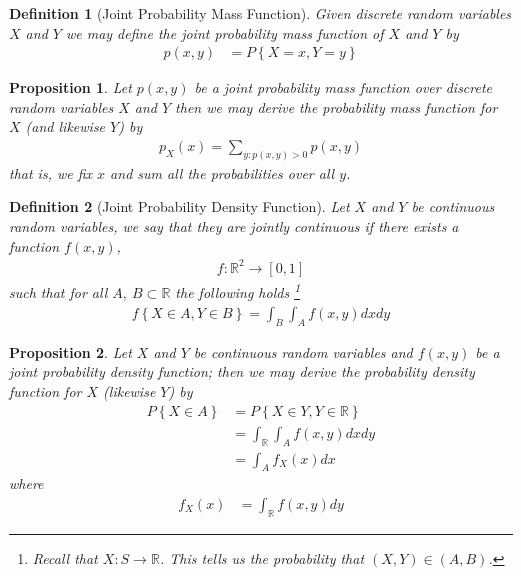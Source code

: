 \documentclass[11pt, oneside]{book}   	%
\newtheorem{definition}{Definition}[chapter]
\newtheorem{proposition}{Proposition}[chapter]
\newcommand{\set}[1]{\left\{#1\right\}}
\begin{document}
\begin{spacing}{1.618}
\begin{definition}[Joint Probability Mass Function]
	Given discrete random variables $X$ and $Y$ we may define the \emph{joint probability mass function} of $X$ and $Y$ by 
	\begin{alignat}{4}
		p(x, y)&=P\set{X=x, Y=y}
	\end{alignat}
\end{definition}

\begin{proposition}
	Let $p(x, y)$ be a joint probability mass function over discrete random variables $X$ and $Y$ then we may derive the probability mass function for $X$ (and likewise $Y$) by 
	\begin{alignat}{4}
		p_X(x)=\sum_{y:p(x, y)>0} p(x, y)
	\end{alignat}
	that is, we fix $x$ and sum all the probabilities over all $y$. 
\end{proposition}

\begin{definition}[Joint Probability Density Function]
	Let $X$ and $Y$ be continuous random variables, we say that they are \emph{jointly continuous} if there exists a function $f(x, y)$,
	\begin{alignat}{4}
		f:\mathbb{R}^2\to [0,1]
	\end{alignat}
	such that for all $A,~B\subset \mathbb{R}$ the following holds \footnote{Recall that $X:S\to \mathbb{R}$. This tells us the probability that $(X, Y)\in (A, B)$.}
	\begin{alignat}{4}
		f\set{X\in A, Y\in B}=\int_B\int_Af(x, y)dx dy
	\end{alignat}
\end{definition}
\end{spacing}

\begin{proposition}
	Let $X$ and $Y$ be continuous random variables and $f(x, y)$ be a joint probability density function; then we may derive the probability density function for $X$ (likewise $Y$) by 
	\begin{alignat*}{4}
		P\set{X\in A}&=P\set{X\in Y, Y\in \mathbb{R}} \\
			&=\int_\mathbb{R}\int_Af(x, y)dx dy \\
			&=\int_A f_X(x)dx 
	\end{alignat*}
	where
	\begin{alignat}{4}
		f_X(x)&=\int_\mathbb{R}f(x, y)dy
	\end{alignat}
\end{proposition}
\end{document}
